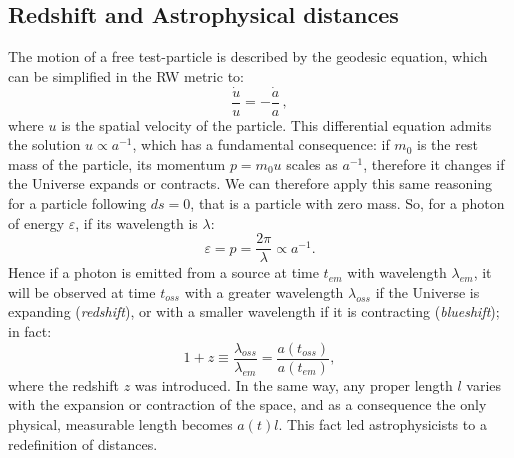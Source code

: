 
\subsection{Redshift and Astrophysical distances}
The motion of a free test-particle is described by the geodesic equation, which can be simplified in the RW metric to:
\begin{equation}
\frac{\dot{u}}{u} = -\frac{\dot{a}}{a}\, , \label{RW11}
\end{equation}
where $u$ is the spatial velocity of the particle. This differential equation admits the solution $u \propto a^{-1}$, which has a fundamental consequence: if $m_0$ is the rest mass of the particle, its momentum $p=m_0u$ scales as $a^{-1}$, 
therefore it changes if the Universe expands or contracts. We can therefore apply this same reasoning for a particle following $ds=0$, that is a particle with zero mass. So, for a photon of energy $\varepsilon$, if its wavelength is $\lambda$:
\begin{equation}
\varepsilon = p = \frac{2\pi}{\lambda} \propto a^{-1}.
\end{equation}Hence if a photon is emitted from a source at time $t_{em}$ with wavelength $\lambda_{em}$, it will be observed at time $t_{oss}$ with a greater wavelength $\lambda_{oss}$ if the Universe is expanding (\emph{redshift}), or with a smaller wavelength if it is contracting  (\emph{blueshift}); in fact:
\begin{equation}
1+z \equiv \frac{\lambda_{oss}}{\lambda_{em}} = \frac{a(t_{oss})}{a(t_{em})},\label{eq:z}
\end{equation}where the redshift $z$ was introduced.
In the same way, any proper length $l$ varies with the expansion or contraction of the space, and as a consequence the only physical, measurable length becomes $a(t)l$. This fact led astrophysicists to a redefinition of distances. 

